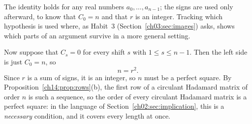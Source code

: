 The identity holds for any real numbers $a_0,\ldots,a_{n-1}$; the signs are used only afterward, to know that $C_0=n$ and that $r$ is an integer. Tracking which hypothesis is used where, as Habit~3 (Section~\ref{ch03:sec:images}) asks, shows which parts of an argument survive in a more general setting.

Now suppose that $C_s=0$ for every shift $s$ with $1\le s\le n-1$. Then the left side is just $C_0=n$, so
\begin{equation}
n=r^2.\label{eq:squareorder}
\end{equation}
Since $r$ is a sum of signs, it is an integer, so $n$ must be a perfect square. By Proposition~\ref{ch14:prop:rows}(b), the first row of a circulant Hadamard matrix of order $n$ is such a sequence, so the order of every circulant Hadamard matrix is a perfect square: in the language of Section~\ref{ch02:sec:implication}, this is a \emph{necessary} condition, and it covers every length at once.

